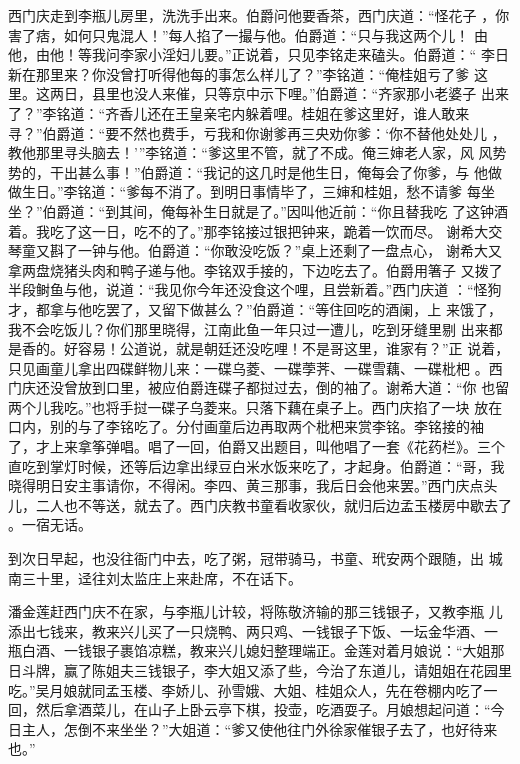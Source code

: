 西门庆走到李瓶儿房里，洗洗手出来。伯爵问他要香茶，西门庆道：“怪花子
，你害了痞，如何只鬼混人！”每人掐了一撮与他。伯爵道：“只与我这两个儿！
由他，由他！等我问李家小淫妇儿要。”正说着，只见李铭走来磕头。伯爵道：“
李日新在那里来？你没曾打听得他每的事怎么样儿了？”李铭道：“俺桂姐亏了爹
这里。这两日，县里也没人来催，只等京中示下哩。”伯爵道：“齐家那小老婆子
出来了？”李铭道：“齐香儿还在王皇亲宅内躲着哩。桂姐在爹这里好，谁人敢来
寻？”伯爵道：“要不然也费手，亏我和你谢爹再三央劝你爹：‘你不替他处处儿
，教他那里寻头脑去！’”李铭道：“爹这里不管，就了不成。俺三婶老人家，风
风势势的，干出甚么事！”伯爵道：“我记的这几时是他生日，俺每会了你爹，与
他做做生日。”李铭道：“爹每不消了。到明日事情毕了，三婶和桂姐，愁不请爹
每坐坐？”伯爵道：“到其间，俺每补生日就是了。”因叫他近前：“你且替我吃
了这钟酒着。我吃了这一日，吃不的了。”那李铭接过银把钟来，跪着一饮而尽。
谢希大交琴童又斟了一钟与他。伯爵道：“你敢没吃饭？”桌上还剩了一盘点心，
谢希大又拿两盘烧猪头肉和鸭子递与他。李铭双手接的，下边吃去了。伯爵用箸子
又拨了半段鲥鱼与他，说道：“我见你今年还没食这个哩，且尝新着。”西门庆道
：“怪狗才，都拿与他吃罢了，又留下做甚么？”伯爵道：“等住回吃的酒阑，上
来饿了，我不会吃饭儿？你们那里晓得，江南此鱼一年只过一遭儿，吃到牙缝里剔
出来都是香的。好容易！公道说，就是朝廷还没吃哩！不是哥这里，谁家有？”正
说着，只见画童儿拿出四碟鲜物儿来：一碟乌菱、一碟荸荠、一碟雪藕、一碟枇杷
。西门庆还没曾放到口里，被应伯爵连碟子都挝过去，倒的袖了。谢希大道：“你
也留两个儿我吃。”也将手挝一碟子乌菱来。只落下藕在桌子上。西门庆掐了一块
放在口内，别的与了李铭吃了。分付画童后边再取两个枇杷来赏李铭。李铭接的袖
了，才上来拿筝弹唱。唱了一回，伯爵又出题目，叫他唱了一套《花药栏》。三个
直吃到掌灯时候，还等后边拿出绿豆白米水饭来吃了，才起身。伯爵道：“哥，我
晓得明日安主事请你，不得闲。李四、黄三那事，我后日会他来罢。”西门庆点头
儿，二人也不等送，就去了。西门庆教书童看收家伙，就归后边孟玉楼房中歇去了
。一宿无话。

到次日早起，也没往衙门中去，吃了粥，冠带骑马，书童、玳安两个跟随，出
城南三十里，迳往刘太监庄上来赴席，不在话下。

潘金莲赶西门庆不在家，与李瓶儿计较，将陈敬济输的那三钱银子，又教李瓶
儿添出七钱来，教来兴儿买了一只烧鸭、两只鸡、一钱银子下饭、一坛金华酒、一
瓶白酒、一钱银子裹馅凉糕，教来兴儿媳妇整理端正。金莲对着月娘说：“大姐那
日斗牌，赢了陈姐夫三钱银子，李大姐又添了些，今治了东道儿，请姐姐在花园里
吃。”吴月娘就同孟玉楼、李娇儿、孙雪娥、大姐、桂姐众人，先在卷棚内吃了一
回，然后拿酒菜儿，在山子上卧云亭下棋，投壶，吃酒耍子。月娘想起问道：“今
日主人，怎倒不来坐坐？”大姐道：“爹又使他往门外徐家催银子去了，也好待来
也。”

